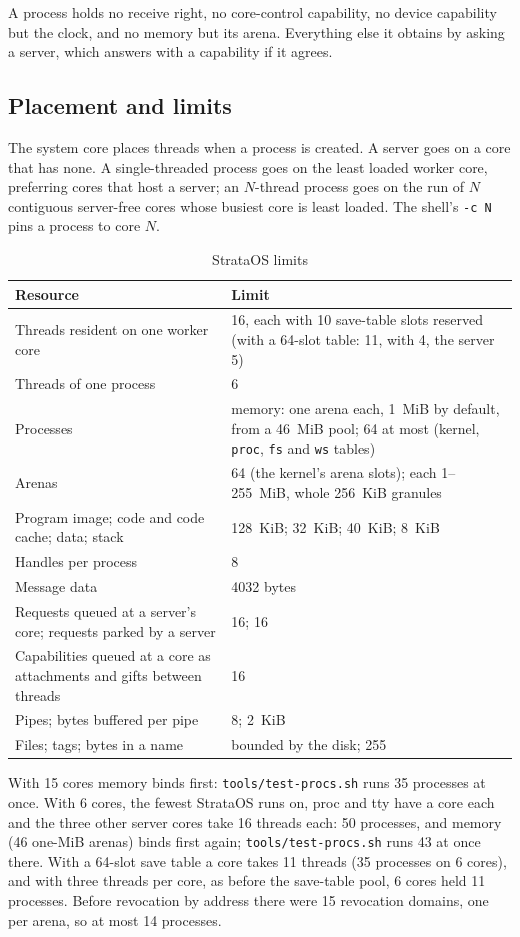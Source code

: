 A process holds no receive right, no core-control capability, no device capability but the clock, and
no memory but its arena. Everything else it obtains by asking a server, which answers with a
capability if it agrees.

\subsection{Placement and limits}
The system core places threads when a process is created. A server goes on a core that has none.
A single-threaded process goes on the least loaded worker core, preferring cores that host a server;
an $N$-thread process goes on the run of $N$ contiguous server-free cores whose busiest core is least
loaded. The shell's \texttt{-c N} pins a process to core $N$.

\begin{table}[htbp]
\centering\small
\caption{StrataOS limits}\label{tab:os-limits}
\begin{tabularx}{\linewidth}{@{}X l@{}}
\toprule
\textbf{Resource} & \textbf{Limit}\\\midrule
Threads resident on one worker core & 16, each with 10 save-table slots reserved (with a 64-slot table: 11, with 4, the server 5)\\
Threads of one process & 6\\
Processes & memory: one arena each, 1~MiB by default, from a 46~MiB pool; 64 at most (kernel, \texttt{proc}, \texttt{fs} and \texttt{ws} tables)\\
Arenas & 64 (the kernel's arena slots); each 1--255~MiB, whole 256~KiB granules\\
Program image; code and code cache; data; stack & 128~KiB; 32~KiB; 40~KiB; 8~KiB\\
Handles per process & 8\\
Message data & 4032 bytes\\
Requests queued at a server's core; requests parked by a server & 16; 16\\
Capabilities queued at a core as attachments and gifts between threads & 16\\
Pipes; bytes buffered per pipe & 8; 2~KiB\\
Files; tags; bytes in a name & bounded by the disk; 255\\
\bottomrule
\end{tabularx}
\end{table}

With 15 cores memory binds first: \texttt{tools/test-procs.sh} runs 35 processes at once. With 6
cores, the fewest StrataOS runs on, proc and tty have a core each and the three other server cores
take 16 threads each: 50 processes, and memory (46 one-MiB arenas) binds first again;
\texttt{tools/test-procs.sh} runs 43 at once there. With a 64-slot save table a core takes 11 threads
(35 processes on 6 cores), and with three threads per core, as before the save-table pool, 6 cores
held 11 processes. Before revocation by address there were 15
revocation domains, one per arena, so at most 14 processes.


